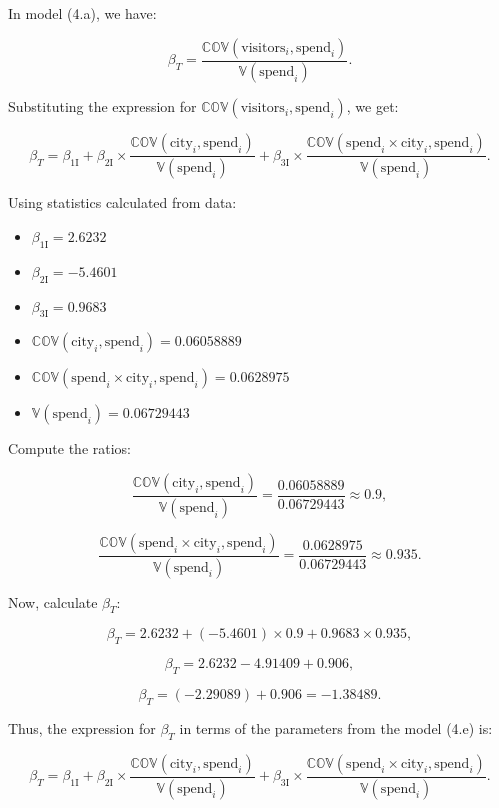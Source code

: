 \documentclass{article}
\begin{document}
In model (4.a), we have:

\[
\beta_T = \frac{\mathbb{COV}(\text{visitors}_i, \text{spend}_i)}{\mathbb{V}(\text{spend}_i)}.
\]

Substituting the expression for \(\mathbb{COV}(\text{visitors}_i, \text{spend}_i)\), we get:

\[
\beta_T = \beta_{1 \text{I}} + \beta_{2 \text{I}} \times \frac{\mathbb{COV}(\text{city}_i, \text{spend}_i)}{\mathbb{V}(\text{spend}_i)} + \beta_{3 \text{I}} \times \frac{\mathbb{COV}(\text{spend}_i \times \text{city}_i, \text{spend}_i)}{\mathbb{V}(\text{spend}_i)}.
\]

Using statistics calculated from data:

\begin{itemize}
    \item \(\beta_{1 \text{I}} = 2.6232\)
    \item \(\beta_{2 \text{I}} = -5.4601\)
    \item \(\beta_{3 \text{I}} = 0.9683\)
    \item \(\mathbb{COV}(\text{city}_i, \text{spend}_i) = 0.06058889\)
    \item \(\mathbb{COV}(\text{spend}_i \times \text{city}_i, \text{spend}_i) = 0.0628975\)
    \item \(\mathbb{V}(\text{spend}_i) = 0.06729443\)
\end{itemize}

Compute the ratios:

\[
\frac{\mathbb{COV}(\text{city}_i, \text{spend}_i)}{\mathbb{V}(\text{spend}_i)} = \frac{0.06058889}{0.06729443} \approx 0.9,
\]

\[
\frac{\mathbb{COV}(\text{spend}_i \times \text{city}_i, \text{spend}_i)}{\mathbb{V}(\text{spend}_i)} = \frac{0.0628975}{0.06729443} \approx 0.935.
\]

Now, calculate \(\beta_T\):

\[
\beta_T = 2.6232 + (-5.4601) \times 0.9 + 0.9683 \times 0.935,
\]

\[
\beta_T = 2.6232 - 4.91409 + 0.906,
\]

\[
\beta_T = (-2.29089) + 0.906 = -1.38489.
\]

Thus, the expression for \(\beta_T\) in terms of the parameters from the model (4.e) is:

\[
\beta_T = \beta_{1 \text{I}} + \beta_{2 \text{I}} \times \frac{\mathbb{COV}(\text{city}_i, \text{spend}_i)}{\mathbb{V}(\text{spend}_i)} + \beta_{3 \text{I}} \times \frac{\mathbb{COV}(\text{spend}_i \times \text{city}_i, \text{spend}_i)}{\mathbb{V}(\text{spend}_i)}.
\]
\end{document}
